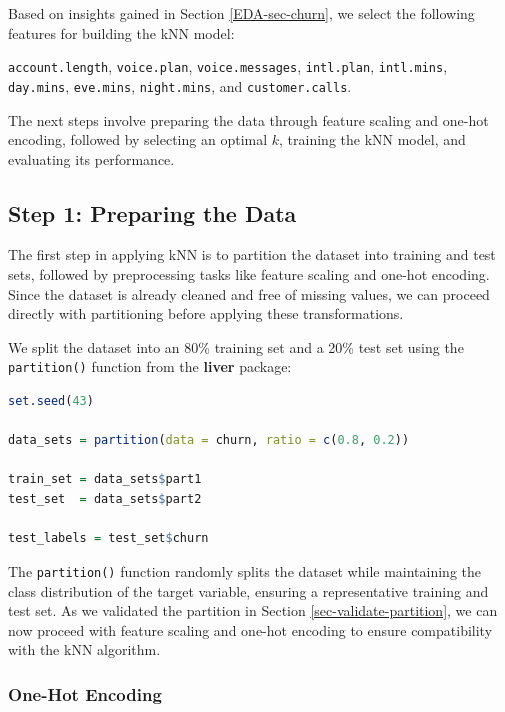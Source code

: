\documentclass[
]{book}
\newcommand{\passthrough}[1]{#1}
\theoremstyle{definition}
\theoremstyle{definition}
\theoremstyle{definition}
\theoremstyle{definition}
\theoremstyle{remark}
\begin{document}
Based on insights gained in Section \ref{EDA-sec-churn}, we select the following features for building the kNN model:

\passthrough{\lstinline!account.length!}, \passthrough{\lstinline!voice.plan!}, \passthrough{\lstinline!voice.messages!}, \passthrough{\lstinline!intl.plan!}, \passthrough{\lstinline!intl.mins!}, \passthrough{\lstinline!day.mins!}, \passthrough{\lstinline!eve.mins!}, \passthrough{\lstinline!night.mins!}, and \passthrough{\lstinline!customer.calls!}.

The next steps involve preparing the data through feature scaling and one-hot encoding, followed by selecting an optimal \(k\), training the kNN model, and evaluating its performance.

\subsection{Step 1: Preparing the Data}\label{step-1-preparing-the-data}

The first step in applying kNN is to partition the dataset into training and test sets, followed by preprocessing tasks like feature scaling and one-hot encoding. Since the dataset is already cleaned and free of missing values, we can proceed directly with partitioning before applying these transformations.

We split the dataset into an 80\% training set and a 20\% test set using the \passthrough{\lstinline!partition()!} function from the \textbf{liver} package:

\begin{lstlisting}[language=R]
set.seed(43)

data_sets = partition(data = churn, ratio = c(0.8, 0.2))

train_set = data_sets$part1
test_set  = data_sets$part2

test_labels = test_set$churn
\end{lstlisting}

The \passthrough{\lstinline!partition()!} function randomly splits the dataset while maintaining the class distribution of the target variable, ensuring a representative training and test set. As we validated the partition in Section \ref{sec-validate-partition}, we can now proceed with feature scaling and one-hot encoding to ensure compatibility with the kNN algorithm.

\subsubsection*{One-Hot Encoding}\label{one-hot-encoding-2}
\end{document}
